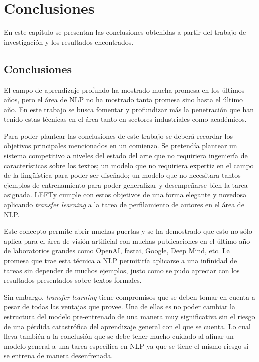 
\chapter{Conclusiones}

\label{Chapter6} %

En este capítulo se presentan las conclusiones obtenidas a partir del trabajo de investigación y los resultados encontrados.

\section{Conclusiones}

El campo de aprendizaje profundo ha mostrado mucha promesa en los últimos años, pero el área de NLP no ha mostrado tanta promesa sino hasta el último año. En este trabajo se busca fomentar y profundizar más la penetración que han tenido estas técnicas en el área tanto en sectores industriales como académicos.

Para poder plantear las conclusiones de este trabajo se deberá recordar los objetivos principales mencionados en un comienzo. Se pretendía plantear un sistema competitivo a niveles del estado del arte que no requiriera ingeniería de características sobre los textos; un modelo que no requiriera expertiz en el campo de la lingüística para poder ser diseñado; un modelo que no necesitara tantos ejemplos de entrenamiento para poder generalizar y desempeñarse bien la tarea asignada. LEFTy cumple con estos objetivos de una forma elegante y novedosa aplicando \textit{transfer learning} a la tarea de perfilamiento de autores en el área de NLP.

Este concepto permite abrir muchas puertas y se ha demostrado que esto no sólo aplica para el área de visión artificial con muchas publicaciones en el último año de laboratorios grandes como OpenAI, fastai, Google, Deep Mind, etc. La promesa que trae esta técnica a NLP permitiría aplicarse a una infinidad de tareas sin depender de muchos ejemplos, justo como se pudo apreciar con los resultados presentados sobre textos formales.

Sin embargo, \textit{transfer learning} tiene compromisos que se deben tomar en cuenta a pesar de todas las ventajas que provee. Una de ellas es no poder cambiar la estructura del modelo pre-entrenado de una manera muy significativa sin el riesgo de una pérdida catastrófica del aprendizaje general con el que se cuenta. Lo cual lleva también a la conclusión que se debe tener mucho cuidado al afinar un modelo general a una tarea específica en NLP ya que se tiene el mismo riesgo si se entrena de manera desenfrenada.

